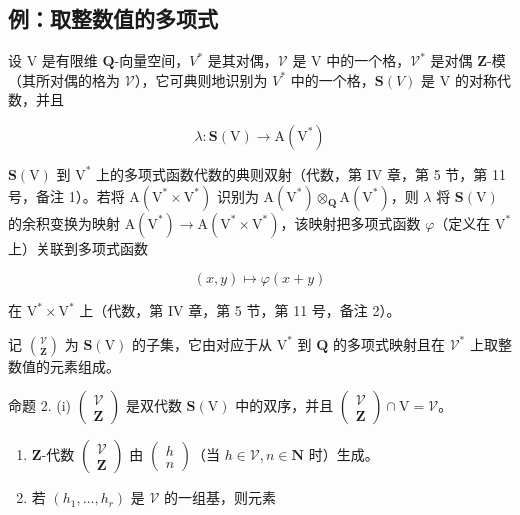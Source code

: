 \subsection{例：取整数值的多项式}

设 V 是有限维 \(\mathbf{Q}\)-向量空间，\(V^{*}\) 是其对偶，\(\mathcal{V}\) 是 V 中的一个格，\(\mathcal{V}^{*}\) 是对偶 \(\mathbf{Z}\)-模（其所对偶的格为 \(\mathcal{V}\)），它可典则地识别为 \(V^{*}\) 中的一个格，\(\mathbf{S}(V)\) 是 V 的对称代数，并且

\[
\lambda : \mathbf {S} (\mathrm{V}) \to \mathrm{A} (\mathrm{V} ^ {*})
\]

\(\mathbf{S}(\mathrm{V})\) 到 \(\mathrm{V}^*\) 上的多项式函数代数的典则双射（代数，第 IV 章，第 5 节，第 11 号，备注 1）。若将 \(\mathrm{A}(\mathrm{V}^* \times \mathrm{V}^*)\) 识别为 \(\mathrm{A}(\mathrm{V}^*) \otimes_{\mathbf{Q}} \mathrm{A}(\mathrm{V}^*)\)，则 \(\lambda\) 将 \(\mathbf{S}(\mathrm{V})\) 的余积变换为映射 \(\mathrm{A}(\mathrm{V}^*) \to \mathrm{A}(\mathrm{V}^* \times \mathrm{V}^*)\)，该映射把多项式函数 \(\varphi\)（定义在 \(\mathrm{V}^*\) 上）关联到多项式函数

\[
(x, y) \mapsto \varphi (x + y)
\]

在 \(\mathrm{V}^* \times \mathrm{V}^*\) 上（代数，第 IV 章，第 5 节，第 11 号，备注 2）。

记 \(\binom{\mathcal{V}}{\mathbf{Z}}\) 为 \(\mathbf{S}(\mathrm{V})\) 的子集，它由对应于从 \(\mathrm{V}^*\) 到 \(\mathbf{Q}\) 的多项式映射且在 \(\mathcal{V}^*\) 上取整数值的元素组成。

命题 2. (i) \(\begin{pmatrix} \mathcal{V} \\ \mathbf{Z} \end{pmatrix}\) 是双代数 \(\mathbf{S}(\mathrm{V})\) 中的双序，并且 \(\begin{pmatrix} \mathcal{V} \\ \mathbf{Z} \end{pmatrix} \cap \mathrm{V} = \mathcal{V}\)。

\begin{enumerate}
\def\labelenumi{(\roman{enumi})}
\setcounter{enumi}{1}
\item
  \(\mathbf{Z}\)-代数 \(\left( \begin{array}{c}\mathcal{V}\\ \mathbf{Z} \end{array} \right)\) 由 \(\left( \begin{array}{c}h\\ n \end{array} \right)\)（当 \(h\in \mathcal{V},n\in \mathbf{N}\) 时）生成。
\item
  若 \((h_1, \ldots, h_r)\) 是 \(\mathcal{V}\) 的一组基，则元素
\end{enumerate}

